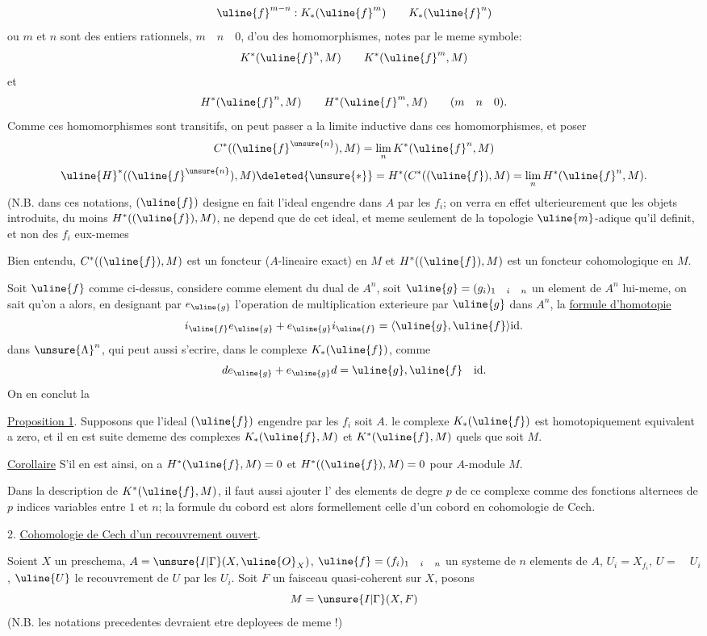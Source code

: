 \[
\uline{f}^{m-n}:K_*(\uline{f}^{m})\qquad K_*(\uline{f}^{n})
\]
ou $m$ et $n$ sont des entiers rationnels, $m\quad n\quad0$, d'ou des homomorphismes, notes par le meme symbole:
\[
K^*(\uline{f}^{n},M)\qquad K^*(\uline{f}^{m},M)
\]
et
\[
H^*(\uline{f}^{n},M)\qquad H^*(\uline{f}^{m},M)\qquad(m\quad n\quad0).
\]
Comme ces homomorphismes sont transitifs, on peut passer a la limite inductive dans ces homomorphismes, et poser
\[
C^*((\uline{f}^{\unsure{n}}),M)=\lim_n K^*(\uline{f}^{n},M)
\]
\[
\uline{H}^*((\uline{f}^{\unsure{n}}),M)\deleted{\unsure{*}}=H^*(C^*((\uline{f}),M)=\lim_n H^*(\uline{f}^{n},M).
\]
(N.B. dans ces notations, $(\uline{f})$ designe en fait l'ideal engendre dans $A$ par les $f_i$; on verra en effet ulterieurement que les objets introduits,  du moins $H^*((\uline{f}),M)$, ne depend que de cet ideal, et meme seulement de la topologie $\uline{m}$-adique qu'il definit, et non des $f_i$ eux-memes

Bien entendu, $C^*((\uline{f}),M)$ est un foncteur  ($A$-lineaire exact) en $M$ et $H^*((\uline{f}),M)$ est un foncteur cohomologique en $M$.

Soit $\uline{f}$ comme ci-dessus,  considere comme element du dual de $A^n$, soit $\uline{g}=(g_i)_{1\quad i\quad n}$ un element de $A^n$ lui-meme, on sait qu'on a alors, en designant par $e_{\uline{g}}$ l'operation de multiplication exterieure par $\uline{g}$ dans $A^n$, la \uline{formule d'homotopie}
\[
i_{\uline{f}}e_{\uline{g}}+e_{\uline{g}}i_{\uline{f}}=\langle\uline{g},\uline{f}\rangle\mathrm{id}.
\]
dans $\unsure{\Lambda}^{n}$, qui peut aussi s'ecrire, dans le complexe $K_*(\uline{f})$, comme
\[
de_{\uline{g}}+e_{\uline{g}}d=\uline{g},\uline{f}\quad\mathrm{id}.
\]
On en conclut la

\uline{Proposition 1}. Supposons que l'ideal $(\uline{f})$ engendre par les $f_i$ soit $A$.  le complexe $K_*(\uline{f})$ est homotopiquement equivalent a zero, et il en est  suite dememe des complexes $K_*(\uline{f},M)$ et $K^*(\uline{f},M)$ quels que soit $M$.

\uline{Corollaire} S'il en est ainsi, on a $H^*(\uline{f},M)=0$ et $H^*((\uline{f}),M)=0$ pour  $A$-module $M$.

Dans la description de $K^*(\uline{f},M)$, il faut aussi ajouter l' des elements de degre $p$ de ce complexe comme des fonctions alternees de $p$ indices variables entre $1$ et $n$; la formule du cobord est alors formellement celle d'un cobord en cohomologie de Cech.

2. \uline{Cohomologie de Cech d'un recouvrement ouvert}.

Soient $X$ un preschema, $A=\unsure{I|\Gamma}(X,\uline{O}_X)$, $\uline{f}=(f_i)_{1\quad i\quad n}$ un systeme de $n$ elements de $A$, $U_i=X_{f_i}$, $U=\quad U_i$, $\uline{U}$ le recouvrement de $U$ par les $U_i$. Soit $F$ un faisceau quasi-coherent sur $X$, posons
\[
M=\unsure{I|\Gamma}(X,F)
\]
(N.B. les notations precedentes devraient etre deployees de meme !)

